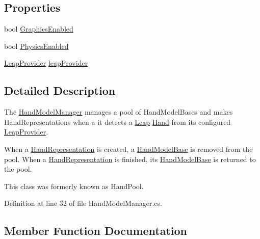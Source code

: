 \subsection*{Properties}
\begin{DoxyCompactItemize}
\item 
bool \mbox{\hyperlink{class_leap_1_1_unity_1_1_hand_model_manager_a16f0efea045dbc8202f20c5a35cb84f6}{Graphics\+Enabled}}
\item 
bool \mbox{\hyperlink{class_leap_1_1_unity_1_1_hand_model_manager_af8053a0572a5b769a4e2b3ad78eacd5f}{Physics\+Enabled}}
\item 
\mbox{\hyperlink{class_leap_1_1_unity_1_1_leap_provider}{Leap\+Provider}} \mbox{\hyperlink{class_leap_1_1_unity_1_1_hand_model_manager_ae529ae3a60ee8a6e88c64261f32b41b8}{leap\+Provider}}
\end{DoxyCompactItemize}


\subsection{Detailed Description}
The \mbox{\hyperlink{class_leap_1_1_unity_1_1_hand_model_manager}{Hand\+Model\+Manager}} manages a pool of Hand\+Model\+Bases and makes Hand\+Representations when a it detects a \mbox{\hyperlink{namespace_leap_1_1_unity_1_1_leap}{Leap}} \mbox{\hyperlink{class_leap_1_1_hand}{Hand}} from its configured \mbox{\hyperlink{class_leap_1_1_unity_1_1_leap_provider}{Leap\+Provider}}. 

When a \mbox{\hyperlink{class_leap_1_1_unity_1_1_hand_representation}{Hand\+Representation}} is created, a \mbox{\hyperlink{class_leap_1_1_unity_1_1_hand_model_base}{Hand\+Model\+Base}} is removed from the pool. When a \mbox{\hyperlink{class_leap_1_1_unity_1_1_hand_representation}{Hand\+Representation}} is finished, its \mbox{\hyperlink{class_leap_1_1_unity_1_1_hand_model_base}{Hand\+Model\+Base}} is returned to the pool.

This class was formerly known as Hand\+Pool. 

Definition at line 32 of file Hand\+Model\+Manager.\+cs.



\subsection{Member Function Documentation}
\mbox{\label{class_leap_1_1_unity_1_1_hand_model_manager_acd9886df388682426cd975688e929cd4}} 
